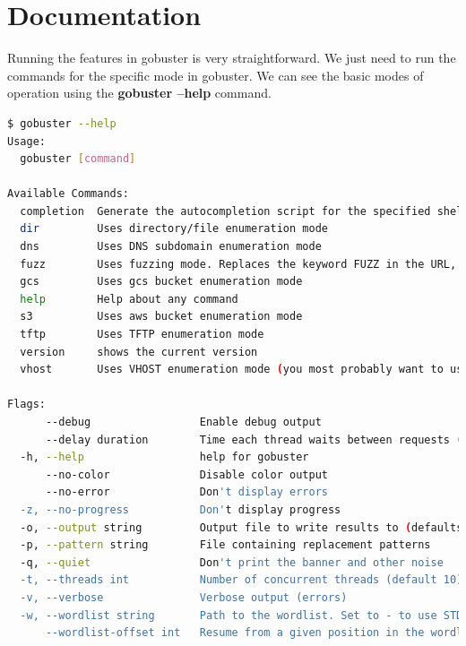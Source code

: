\documentclass[12 pt]{article}
\begin{document}
\section{Documentation}
Running the features in gobuster is very straightforward. We just need to run the commands for the specific mode in gobuster. We can see the basic modes of operation using the \textbf{gobuster --help} command.\\ 
\begin{lstlisting}[language=bash]
$ gobuster --help                             
Usage:
  gobuster [command]

Available Commands:
  completion  Generate the autocompletion script for the specified shell
  dir         Uses directory/file enumeration mode
  dns         Uses DNS subdomain enumeration mode
  fuzz        Uses fuzzing mode. Replaces the keyword FUZZ in the URL, Headers and the request body
  gcs         Uses gcs bucket enumeration mode
  help        Help about any command
  s3          Uses aws bucket enumeration mode
  tftp        Uses TFTP enumeration mode
  version     shows the current version
  vhost       Uses VHOST enumeration mode (you most probably want to use the IP address as the URL parameter)

Flags:
      --debug                 Enable debug output
      --delay duration        Time each thread waits between requests (e.g. 1500ms)
  -h, --help                  help for gobuster
      --no-color              Disable color output
      --no-error              Don't display errors
  -z, --no-progress           Don't display progress
  -o, --output string         Output file to write results to (defaults to stdout)
  -p, --pattern string        File containing replacement patterns
  -q, --quiet                 Don't print the banner and other noise
  -t, --threads int           Number of concurrent threads (default 10)
  -v, --verbose               Verbose output (errors)
  -w, --wordlist string       Path to the wordlist. Set to - to use STDIN.
      --wordlist-offset int   Resume from a given position in the wordlist (defaults to 0)
\end{lstlisting}
\end{document}
